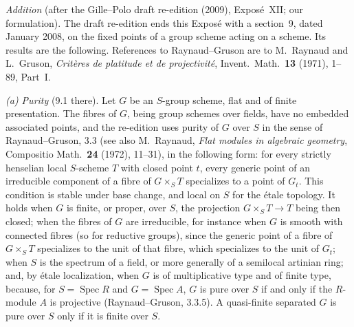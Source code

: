\par\medskip\noindent
\emph{Addition} (after the Gille--Polo draft re-edition (2009), Exposé~XII;
our formulation). The draft re-edition ends this Exposé with a section~9,
dated January 2008, on the fixed points of a group scheme acting on a
scheme. Its results are the following. References to Raynaud--Gruson are to
M.~Raynaud and L.~Gruson, \emph{Critères de platitude et de projectivité},
Invent.\ Math.\ \textbf{13} (1971), 1--89, Part~I.

\emph{(a) Purity} (9.1 there). Let \(G\) be an \(S\)-group scheme, flat and
of finite presentation. The fibres of \(G\), being group schemes over
fields, have no embedded associated points, and the re-edition uses purity
of \(G\) over \(S\) in the sense of Raynaud--Gruson, 3.3 (see also
M.~Raynaud, \emph{Flat modules in algebraic geometry}, Compositio Math.\
\textbf{24} (1972), 11--31), in the following form: for every strictly
henselian local \(S\)-scheme \(T\) with closed point \(t\), every generic
point of an irreducible component of a fibre of \(G\times_ST\) specializes
to a point of \(G_t\). This condition is stable under base change, and local
on \(S\) for the étale topology. It holds when \(G\) is finite, or proper,
over \(S\), the projection \(G\times_ST\to T\) being then closed; when the
fibres of \(G\) are irreducible, for instance when \(G\) is smooth with
connected fibres (so for reductive groups), since the generic point of a
fibre of \(G\times_ST\) specializes to the unit of that fibre, which
specializes to the unit of \(G_t\); when \(S\) is the spectrum of a field,
or more generally of a semilocal artinian ring; and, by étale localization,
when \(G\) is of multiplicative type and of finite type, because, for
\(S=\operatorname{Spec}R\) and \(G=\operatorname{Spec}A\), \(G\) is pure
over \(S\) if and only if the \(R\)-module \(A\) is projective
(Raynaud--Gruson, 3.3.5). A quasi-finite separated \(G\) is pure over \(S\)
only if it is finite over \(S\).

